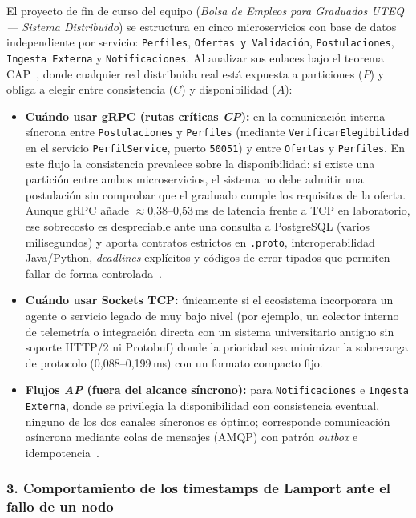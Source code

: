 El proyecto de fin de curso del equipo (\emph{Bolsa de Empleos para Graduados UTEQ --- Sistema Distribuido}) se estructura en cinco microservicios con base de datos independiente por servicio: \texttt{Perfiles}, \texttt{Ofertas y Validación}, \texttt{Postulaciones}, \texttt{Ingesta Externa} y \texttt{Notificaciones}. Al analizar sus enlaces bajo el teorema CAP~\cite{khoshaba2023cap}, donde cualquier red distribuida real está expuesta a particiones ($P$) y obliga a elegir entre consistencia ($C$) y disponibilidad ($A$):
\begin{itemize}
  \item \textbf{Cuándo usar gRPC (rutas críticas \emph{CP}):} en la comunicación interna síncrona entre \texttt{Postulaciones} y \texttt{Perfiles} (mediante \texttt{VerificarElegibilidad} en el servicio \texttt{PerfilService}, puerto \texttt{50051}) y entre \texttt{Ofertas} y \texttt{Perfiles}. En este flujo la consistencia prevalece sobre la disponibilidad: si existe una partición entre ambos microservicios, el sistema no debe admitir una postulación sin comprobar que el graduado cumple los requisitos de la oferta. Aunque gRPC añade $\approx$0,38--0,53\,ms de latencia frente a TCP en laboratorio, ese sobrecosto es despreciable ante una consulta a PostgreSQL (varios milisegundos) y aporta contratos estrictos en \texttt{.proto}, interoperabilidad Java/Python, \emph{deadlines} explícitos y códigos de error tipados que permiten fallar de forma controlada~\cite{niswar2024performance,zhu2025rethinking}.
  \item \textbf{Cuándo usar Sockets TCP:} únicamente si el ecosistema incorporara un agente o servicio legado de muy bajo nivel (por ejemplo, un colector interno de telemetría o integración directa con un sistema universitario antiguo sin soporte HTTP/2 ni Protobuf) donde la prioridad sea minimizar la sobrecarga de protocolo (0,088--0,199\,ms) con un formato compacto fijo.
  \item \textbf{Flujos \emph{AP} (fuera del alcance síncrono):} para \texttt{Notificaciones} e \texttt{Ingesta Externa}, donde se privilegia la disponibilidad con consistencia eventual, ninguno de los dos canales síncronos es óptimo; corresponde comunicación asíncrona mediante colas de mensajes (AMQP) con patrón \emph{outbox} e idempotencia~\cite{mohammad2025resilient}.
\end{itemize}

\subsubsection{3. Comportamiento de los timestamps de Lamport ante el fallo de un nodo}

